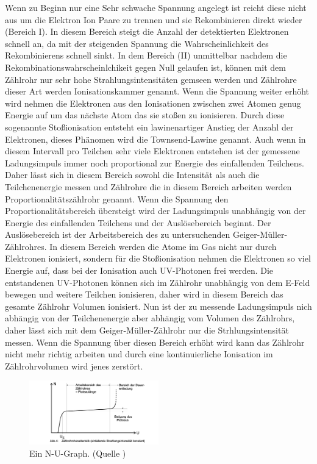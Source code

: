 Wenn zu Beginn nur eine Sehr schwache Spannung angelegt ist reicht diese nicht aus um die Elektron Ion Paare zu trennen und sie Rekombinieren direkt wieder (Bereich I).
In diesem Bereich steigt die Anzahl der detektierten Elektronen schnell an, da mit der steigenden Spannung die Wahrscheinlichkeit des Rekombinierens schnell sinkt.
In dem Bereich (II) unmittelbar nachdem die Rekombinationswahrscheinlchikeit gegen Null gelaufen ist, können mit dem Zählrohr nur sehr hohe Strahlungsintensitäten gemseen werden und Zählrohre dieser Art werden Ionisationskammer genannt.
Wenn die Spannung weiter erhöht wird nehmen die Elektronen aus den Ionisationen zwischen zwei Atomen genug Energie auf um das nächste Atom das sie stoßen zu ionisieren.
Durch diese sogenannte Stoßionisation entsteht ein lawinenartiger Anstieg der Anzahl der Elektronen, dieses Phänomen wird die Townsend-Lawine genannt.
Auch wenn in diesem Intervall pro Teilchen sehr viele Elektronen entstehen ist der gemessene Ladungsimpuls immer noch proportional zur Energie des einfallenden Teilchens.
Daher lässt sich in diesem Bereich sowohl die Intensität als auch die Teilchenenergie messen und Zählrohre die in diesem Bereich arbeiten werden Proportionalitätszählrohr genannt.
Wenn die Spannung den Proportionalitätsbereich übersteigt wird der Ladungsimpuls unabhängig von der Energie des einfallenden Teilchens und der Auslösebereich beginnt.
Der Auslösebereich ist der Arbeitsbereich des zu untersuchenden Geiger-Müller-Zählrohres.
In diesem Bereich werden die Atome im Gas nicht nur durch Elektronen ionisiert, sondern für die Stoßionisation nehmen die Elektronen so viel Energie auf, dass bei der Ionisation auch UV-Photonen frei werden.
Die entstandenen UV-Photonen  können sich im Zählrohr unabhängig von dem E-Feld bewegen und weitere Teilchen ionisieren, daher wird in diesem Bereich das gesamte Zählrohr Volumen ionisiert.
Nun ist der zu messende Ladungsimpuls nich abhängig von der Teilchenenergie aber abhängig vom Volumen des Zählrohrs, daher lässt sich mit dem Geiger-Müller-Zählrohr nur die Strhlungsintensität messen.
Wenn die Spannung über diesen Bereich erhöht wird kann das Zählrohr nicht mehr richtig arbeiten und durch eine kontinuierliche Ionisation im Zählrohrvolumen wird jenes zerstört.
\begin{figure}
    \centering
    \includegraphics[width=0.5\textwidth]{bilder/Zaehlrohr_N_U_Graph.png}
    \caption{Ein N-U-Graph. (Quelle \cite{Anleitung})}
    \label{fig:Zaehlrohr_N_U_Graph}
\end{figure}
